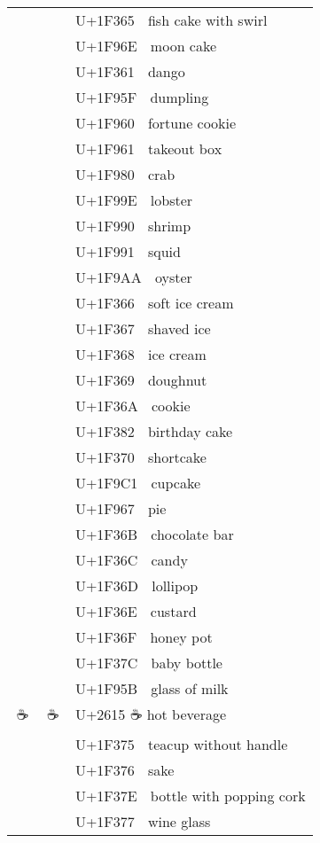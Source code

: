 \documentclass[a4paper,12pt]{ltjarticle}
\newcommand{\fontA}[1]{{\fontspec[RawFeature={mode=harf,+dist,+ccmp}]{Segoe UI Emoji} #1}}
\newcommand{\fontB}[1]{{\fontspec[RawFeature={mode=harf,+dist,+ccmp}]{Noto Color Emoji} #1}}
\begin{document}
\begin{longtable}[c]{ccp{0.8\linewidth}}
\fontA{🍥}&\fontB{🍥}&U+1F365 🍥 fish cake with swirl\\
\fontA{🥮}&\fontB{🥮}&U+1F96E 🥮 moon cake\\
\fontA{🍡}&\fontB{🍡}&U+1F361 🍡 dango\\
\fontA{🥟}&\fontB{🥟}&U+1F95F 🥟 dumpling\\
\fontA{🥠}&\fontB{🥠}&U+1F960 🥠 fortune cookie\\
\fontA{🥡}&\fontB{🥡}&U+1F961 🥡 takeout box\\
\fontA{🦀}&\fontB{🦀}&U+1F980 🦀 crab\\
\fontA{🦞}&\fontB{🦞}&U+1F99E 🦞 lobster\\
\fontA{🦐}&\fontB{🦐}&U+1F990 🦐 shrimp\\
\fontA{🦑}&\fontB{🦑}&U+1F991 🦑 squid\\
\fontA{🦪}&\fontB{🦪}&U+1F9AA 🦪 oyster\\
\fontA{🍦}&\fontB{🍦}&U+1F366 🍦 soft ice cream\\
\fontA{🍧}&\fontB{🍧}&U+1F367 🍧 shaved ice\\
\fontA{🍨}&\fontB{🍨}&U+1F368 🍨 ice cream\\
\fontA{🍩}&\fontB{🍩}&U+1F369 🍩 doughnut\\
\fontA{🍪}&\fontB{🍪}&U+1F36A 🍪 cookie\\
\fontA{🎂}&\fontB{🎂}&U+1F382 🎂 birthday cake\\
\fontA{🍰}&\fontB{🍰}&U+1F370 🍰 shortcake\\
\fontA{🧁}&\fontB{🧁}&U+1F9C1 🧁 cupcake\\
\fontA{🥧}&\fontB{🥧}&U+1F967 🥧 pie\\
\fontA{🍫}&\fontB{🍫}&U+1F36B 🍫 chocolate bar\\
\fontA{🍬}&\fontB{🍬}&U+1F36C 🍬 candy\\
\fontA{🍭}&\fontB{🍭}&U+1F36D 🍭 lollipop\\
\fontA{🍮}&\fontB{🍮}&U+1F36E 🍮 custard\\
\fontA{🍯}&\fontB{🍯}&U+1F36F 🍯 honey pot\\
\fontA{🍼}&\fontB{🍼}&U+1F37C 🍼 baby bottle\\
\fontA{🥛}&\fontB{🥛}&U+1F95B 🥛 glass of milk\\
\fontA{☕}&\fontB{☕}&U+2615 ☕ hot beverage\\
\fontA{🍵}&\fontB{🍵}&U+1F375 🍵 teacup without handle\\
\fontA{🍶}&\fontB{🍶}&U+1F376 🍶 sake\\
\fontA{🍾}&\fontB{🍾}&U+1F37E 🍾 bottle with popping cork\\
\fontA{🍷}&\fontB{🍷}&U+1F377 🍷 wine glass\\

\end{longtable}
\end{document}

